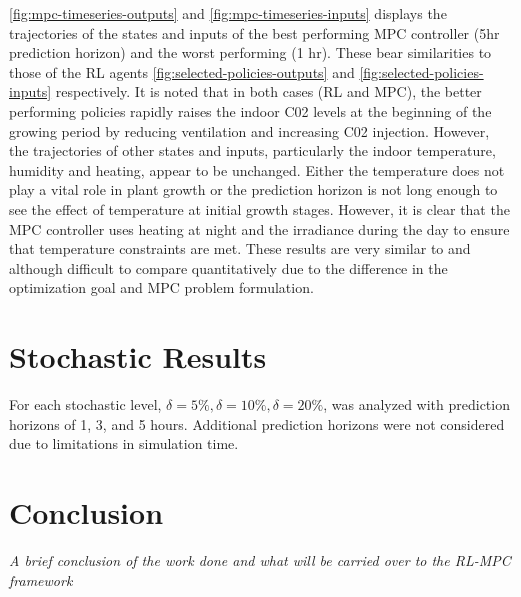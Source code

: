 \autoref{fig:mpc-timeseries-outputs} and \autoref{fig:mpc-timeseries-inputs} displays the trajectories of the states and inputs of the best performing MPC controller (5hr prediction horizon) and the worst performing (1 hr). These bear similarities to those of the RL agents \autoref{fig:selected-policies-outputs} and \autoref{fig:selected-policies-inputs} respectively. It is noted that in both cases (RL and MPC), the better performing policies rapidly raises the indoor C02 levels at the beginning of the growing period by reducing ventilation and increasing C02 injection. However, the trajectories of other states and inputs, particularly the indoor temperature, humidity and heating, appear to be unchanged. Either the temperature does not play a vital role in plant growth or the prediction horizon is not long enough to see the effect of temperature at initial growth stages. However, it is clear that the MPC controller uses heating at night and the irradiance during the day to ensure that temperature constraints are met. These results are very similar to \cite{morcegoReinforcementLearningModel2023} and \cite{boersmaRobustSamplebasedModel2022} although difficult to compare quantitatively due to the difference in the optimization goal and MPC problem formulation.


\section{Stochastic Results}
For each stochastic level, $\delta = 5\%, \delta = 10\%, \delta = 20\%$, was analyzed with prediction horizons of 1, 3, and 5 hours. Additional prediction horizons were not considered due to limitations in simulation time. 


\section{Conclusion}
\emph{A brief conclusion of the work done and what will be carried over to the RL-MPC framework}